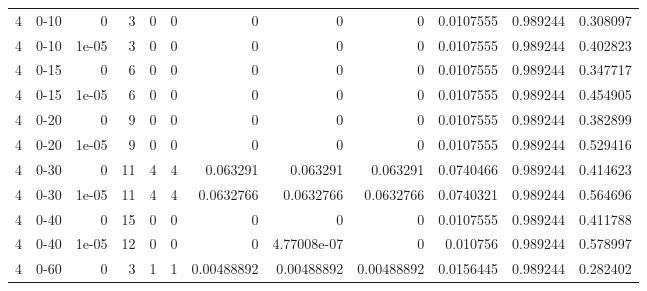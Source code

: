 \begin{tabular}{rlrrrrrrrrrr}
     4 & 0-10   &      0     &           3 &                 0 &                 0 &     0           &     0           &      0           &        0.0107555 &               0.989244 &           0.308097 \\
     4 & 0-10   &      1e-05 &           3 &                 0 &                 0 &     0           &     0           &      0           &        0.0107555 &               0.989244 &           0.402823 \\
     4 & 0-15   &      0     &           6 &                 0 &                 0 &     0           &     0           &      0           &        0.0107555 &               0.989244 &           0.347717 \\
     4 & 0-15   &      1e-05 &           6 &                 0 &                 0 &     0           &     0           &      0           &        0.0107555 &               0.989244 &           0.454905 \\
     4 & 0-20   &      0     &           9 &                 0 &                 0 &     0           &     0           &      0           &        0.0107555 &               0.989244 &           0.382899 \\
     4 & 0-20   &      1e-05 &           9 &                 0 &                 0 &     0           &     0           &      0           &        0.0107555 &               0.989244 &           0.529416 \\
     4 & 0-30   &      0     &          11 &                 4 &                 4 &     0.063291    &     0.063291    &      0.063291    &        0.0740466 &               0.989244 &           0.414623 \\
     4 & 0-30   &      1e-05 &          11 &                 4 &                 4 &     0.0632766   &     0.0632766   &      0.0632766   &        0.0740321 &               0.989244 &           0.564696 \\
     4 & 0-40   &      0     &          15 &                 0 &                 0 &     0           &     0           &      0           &        0.0107555 &               0.989244 &           0.411788 \\
     4 & 0-40   &      1e-05 &          12 &                 0 &                 0 &     0           &     4.77008e-07 &      0           &        0.010756  &               0.989244 &           0.578997 \\
     4 & 0-60   &      0     &           3 &                 1 &                 1 &     0.00488892  &     0.00488892  &      0.00488892  &        0.0156445 &               0.989244 &           0.282402 \\

\end{tabular}
